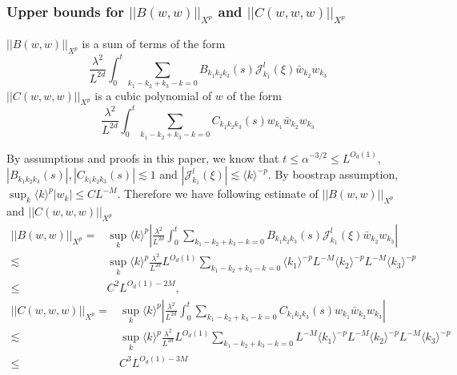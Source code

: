 \subsubsection{Upper bounds for $||B(w,w)||_{X^p}$ and $||C(w,w,w)||_{X^p}$} $||B(w,w)||_{X^p}$ is a sum of terms of the form
\begin{equation}
 \frac{\lambda^2}{L^{2d}} \int^{t}_0\sum_{k_1-k_2+k_3-k=0} B_{k_1k_2k_3}(s) \mathcal{J}^{l}_{k_1}(\xi)\bar{w}_{k_2}w_{k_3}
\end{equation}
$||C(w,w,w)||_{X^p}$ is a cubic polynomial of $w$ of the form
\begin{equation}
 \frac{\lambda^2}{L^{2d}} \int^{t}_0\sum_{k_1-k_2+k_3-k=0} C_{k_1k_2k_3}(s) w_{k_1}\bar{w}_{k_2}w_{k_3}
\end{equation}

By assumptions and proofs in this paper, we know that $t\le \alpha^{-3/2}\le L^{O_d(1)}$, $|B_{k_1k_2k_3}(s)|, |C_{k_1k_2k_3}(s)|\lesssim 1$ and $|\mathcal{J}^{l}_{k_1}(\xi)|\lesssim \langle k\rangle^{-p}$. By boostrap assumption, $\sup_{k} \langle k\rangle^{p} |w_k|\le CL^{-M}$. Therefore we have following estimate of $||B(w,w)||_{X^p}$ and $||C(w,w,w)||_{X^p}$
\begin{equation}
\begin{split}
 ||B(w,w)||_{X^p}=&\sup_{k} \langle k\rangle^{p} \left|\frac{\lambda^2}{L^{2d}} \int^{t}_0\sum_{k_1-k_2+k_3-k=0} B_{k_1k_2k_3}(s) \mathcal{J}^{l}_{k_1}(\xi)\bar{w}_{k_2}w_{k_3}\right| 
 \\
 \lesssim& \sup_{k} \langle k\rangle^{p} \frac{\lambda^2}{L^{2d}} L^{O_d(1)} \sum_{k_1-k_2+k_3-k=0} \langle k_1\rangle^{-p} L^{-M}\langle k_2\rangle^{-p} L^{-M}\langle k_3\rangle^{-p}
 \\
 \le& C^2 L^{O_d(1)-2M},
\end{split}
\end{equation}
\begin{equation}
\begin{split}
 ||C(w,w,w)||_{X^p}=&\sup_{k} \langle k\rangle^{p} \left|\frac{\lambda^2}{L^{2d}} \int^{t}_0\sum_{k_1-k_2+k_3-k=0} C_{k_1k_2k_3}(s) w_{k_1}\bar{w}_{k_2}w_{k_3}\right|
 \\
 \lesssim& \sup_{k} \langle k\rangle^{p} \frac{\lambda^2}{L^{2d}} L^{O_d(1)} \sum_{k_1-k_2+k_3-k=0} L^{-M}\langle k_1\rangle^{-p} L^{-M}\langle k_2\rangle^{-p} L^{-M}\langle k_3\rangle^{-p}
 \\
 \le& C^3 L^{O_d(1)-3M}
\end{split}
\end{equation}

